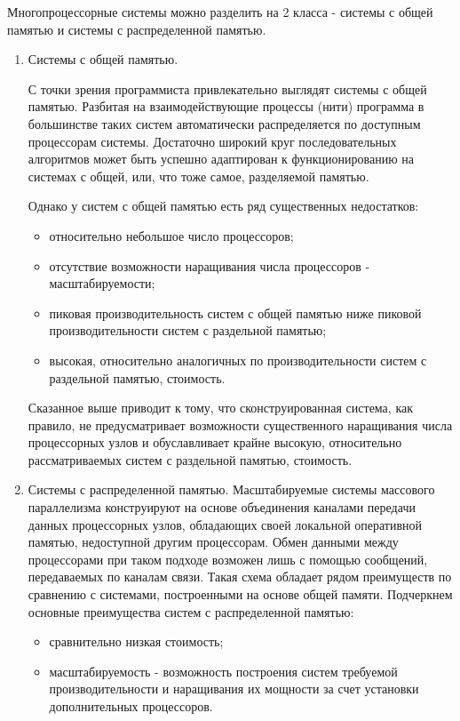 Многопроцессорные системы можно разделить на 2 класса - системы с общей памятью
и системы с распределенной памятью.
\begin{enumerate}
\item  Системы с общей памятью. 

С точки зрения программиста привлекательно выглядят системы с общей памятью.
Разбитая на взаимодействующие процессы (нити) программа в большинстве таких
систем автоматически распределяется по доступным процессорам системы. Достаточно
широкий круг последовательных алгоритмов может быть успешно адаптирован к
функционированию на системах с общей, или, что тоже самое, разделяемой памятью.

Однако у систем с общей памятью есть ряд существенных недостатков:
\begin{itemize}
\item относительно небольшое число процессоров;
\item отсутствие возможности наращивания числа процессоров - масштабируемости;
\item пиковая производительность систем с общей памятью ниже пиковой
производительности систем с раздельной памятью;
\item высокая, относительно аналогичных по производительности систем с
раздельной памятью, стоимость.
\end{itemize}
Сказанное выше приводит к тому, что сконструированная система, как правило, не
предусматривает возможности существенного наращивания числа процессорных узлов и
обуславливает крайне высокую, относительно рассматриваемых систем с раздельной
памятью, стоимость.
 
\item Системы с распределенной памятью.
 Масштабируемые системы массового параллелизма конструируют на основе
объединения каналами передачи данных процессорных узлов, обладающих своей
локальной оперативной памятью, недоступной другим процессорам. Обмен данными
между процессорами при таком подходе возможен лишь с помощью сообщений,
передаваемых по каналам связи. Такая схема обладает рядом преимуществ по
сравнению с системами, построенными на основе общей памяти. Подчеркнем основные
преимущества систем с распределенной памятью:
\begin{itemize}
\item сравнительно низкая стоимость;
\item масштабируемость - возможность построения систем требуемой
производительности и наращивания их мощности за счет установки дополнительных
процессоров.
\end{itemize}


\end{enumerate}
